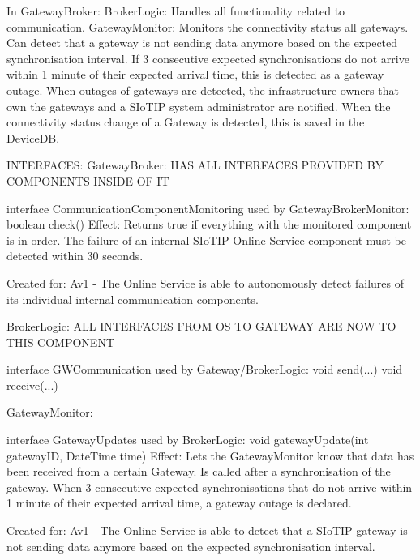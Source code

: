        In GatewayBroker:
            BrokerLogic: Handles all functionality related to communication.
            GatewayMonitor: Monitors the connectivity status all gateways. Can detect that a gateway is not sending data anymore based on the expected synchronisation interval. If 3 consecutive expected synchronisations do not arrive within 1 minute of their expected arrival time,
                            this is detected as a gateway outage. When outages of gateways are detected, the infrastructure owners that own the gateways and a SIoTIP system administrator are notified.
                            When the connectivity status change of a Gateway is detected, this is saved in the DeviceDB.

        INTERFACES:
            GatewayBroker:
                HAS ALL INTERFACES PROVIDED BY COMPONENTS INSIDE OF IT

                interface CommunicationComponentMonitoring used by GatewayBrokerMonitor:
                    boolean check()
                    Effect: Returns true if everything with the monitored component is in order. The failure of an internal SIoTIP Online Service component must be detected within 30 seconds.
                    \item Created for: Av1 - The Online Service is able to autonomously detect failures of its individual internal communication components.


            BrokerLogic:
                ALL INTERFACES FROM OS TO GATEWAY ARE NOW TO THIS COMPONENT

                interface GWCommunication used by Gateway/BrokerLogic:
                    void send(...)
                    void receive(...)

            GatewayMonitor:

                interface GatewayUpdates used by BrokerLogic:
                    void gatewayUpdate(int gatewayID, DateTime time)
                        Effect: Lets the GatewayMonitor know that data has been received from a certain Gateway. Is called after a synchronisation of the gateway.
                                When 3 consecutive expected synchronisations that do not arrive within 1 minute of their expected arrival time, a gateway outage is declared.
                        \item Created for: Av1 - The Online Service is able to detect that a SIoTIP gateway is not sending data anymore based on the expected synchronisation interval.

